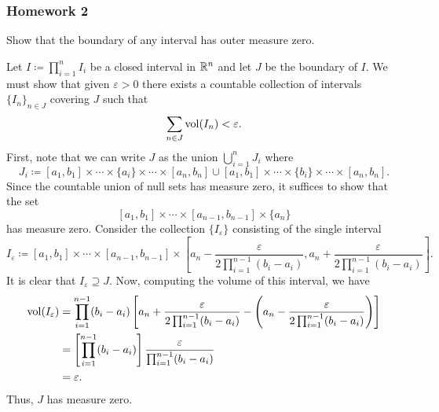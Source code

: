 \subsubsection{Homework 2}
\setcounter{exercise}{0}
\setcounter{equation}{0}

\begin{problem}
  Show that the boundary of any interval has outer measure zero.
\end{problem}
\begin{solution}
  Let $I\coloneq\prod_{i=1}^n I_i$ be a closed interval in $\mathbb{R}^n$ and let
  $J$ be the boundary of $I$. We must show that given $\varepsilon>0$ there
  exists a countable collection of intervals $\{I_n\}_{n\in J}$ covering
  $J$ such that
  \[
    \sum_{n\in J}\operatorname{vol}(I_n)<\varepsilon.
  \]
  First, note that we can write $J$ as the union $\bigcup_{i=1}^n J_i$
  where
  \[
    J_i\coloneq%
      [a_1,b_1]\times\cdots\times\{a_i\}\times\cdots\times[a_n,b_n]%
    \cup
    [a_1,b_1]\times\cdots\times\{b_i\}\times\cdots\times[a_n,b_n].
  \]
  Since the countable union of null sets has measure zero, it suffices to
  show that the set
  \[
    [a_1,b_1]\times\cdots\times[a_{n-1},b_{n-1}]\times\{a_n\}%
  \]
  has measure zero. Consider the collection $\{I_\varepsilon\}$ consisting
  of the single interval
  \[
    I_\varepsilon\coloneq [a_1,b_1]\times\cdots\times[a_{n-1},b_{n-1}]
    \times\left[a_n-\frac{\varepsilon}{2\prod_{i=1}^{n-1}(b_i-a_i)},
      a_n+\frac{\varepsilon}{2\prod_{i=1}^{n-1}(b_i-a_i)}\right].
  \]
  It is clear that $I_\varepsilon\supseteq J$. Now, computing the volume of
  this interval, we have
  \begin{align*}
    \vol(I_\varepsilon)%
    &=\prod_{i=1}^{n-1}(b_i-a_i)%
    \left[%
    a_n+\frac{\varepsilon}{2\prod_{i=1}^{n-1}(b_i-a_i)}%
    -\left(%
    a_n -\frac{\varepsilon}{2\prod_{i=1}^{n-1}(b_i-a_i)} \right)
    \right]\\
    &=\left[\prod_{i=1}^{n-1}(b_i-a_i)\right]%
      \frac{\varepsilon}{\prod_{i=1}^{n-1}(b_i-a_i)}\\
    &=\varepsilon.
  \end{align*}
  Thus, $J$ has measure zero.
\end{solution}

